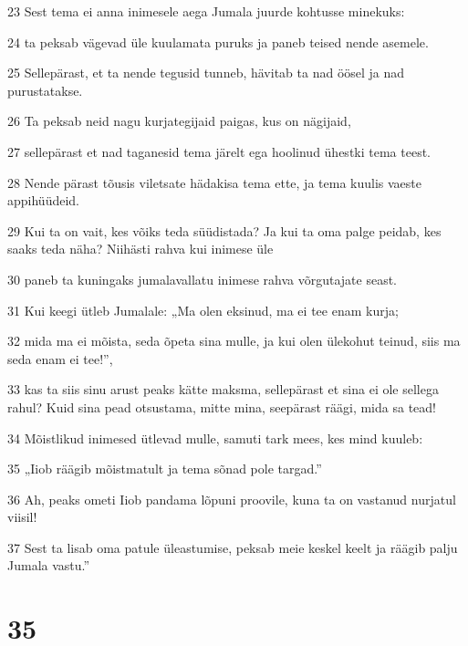 \par 23 Sest tema ei anna inimesele aega Jumala juurde kohtusse minekuks:
\par 24 ta peksab vägevad üle kuulamata puruks ja paneb teised nende asemele.
\par 25 Sellepärast, et ta nende tegusid tunneb, hävitab ta nad öösel ja nad purustatakse.
\par 26 Ta peksab neid nagu kurjategijaid paigas, kus on nägijaid,
\par 27 sellepärast et nad taganesid tema järelt ega hoolinud ühestki tema teest.
\par 28 Nende pärast tõusis viletsate hädakisa tema ette, ja tema kuulis vaeste appihüüdeid.
\par 29 Kui ta on vait, kes võiks teda süüdistada? Ja kui ta oma palge peidab, kes saaks teda näha? Niihästi rahva kui inimese üle
\par 30 paneb ta kuningaks jumalavallatu inimese rahva võrgutajate seast.
\par 31 Kui keegi ütleb Jumalale: „Ma olen eksinud, ma ei tee enam kurja;
\par 32 mida ma ei mõista, seda õpeta sina mulle, ja kui olen ülekohut teinud, siis ma seda enam ei tee!”,
\par 33 kas ta siis sinu arust peaks kätte maksma, sellepärast et sina ei ole sellega rahul? Kuid sina pead otsustama, mitte mina, seepärast räägi, mida sa tead!
\par 34 Mõistlikud inimesed ütlevad mulle, samuti tark mees, kes mind kuuleb:
\par 35 „Iiob räägib mõistmatult ja tema sõnad pole targad.”
\par 36 Ah, peaks ometi Iiob pandama lõpuni proovile, kuna ta on vastanud nurjatul viisil!
\par 37 Sest ta lisab oma patule üleastumise, peksab meie keskel keelt ja räägib palju Jumala vastu.”

\chapter{35}

